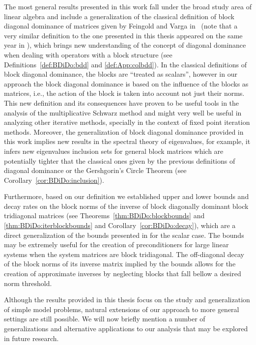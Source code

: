 The most general results presented in this work fall under the broad
study area of linear algebra and include a generalization of the
classical definition of block diagonal dominance of matrices given by Feingold
and Varga in~\cite{FeiVar62} (note that a very similar definition to the one
presented in this thesis appeared on the same year in
\cite{BenEvaHamLupSla17}), which brings new understanding of the concept of
diagonal dominance when dealing with operators with a block structure (see Definitions~\ref{def:BDiDo:bdd} and \ref{def:App:colbdd}). In the
classical definitions of block diagonal dominance, the blocks are ``treated as scalars'', however in our approach the block diagonal dominance is based on the
influence of the blocks as matrices, i.e., the action of the block is taken
into account not just their norms. This new definition and its consequences
have proven to be useful tools in the analysis of the multiplicative Schwarz
method and might very well be useful in analyzing other iterative methods,
specially in the context of fixed point iteration methods. Moreover, the generalization of block diagonal dominance provided in
this work implies new results in the spectral theory of eigenvalues, for
example, it infers new eigenvalues inclusion sets for general block matrices
which are potentially tighter that the classical ones given by the previous
definitions of diagonal dominance or the Gershgorin's Circle Theorem (see
Corollary~\ref{cor:BDiDo:inclusion}).

Furthermore, based on our definition we established upper and lower bounds and
decay rates on the block norms of the inverse of block diagonally dominant
block tridiagonal matrices (see Theorems~\ref{thm:BDiDo:blockbounds} and
\ref{thm:BDiDo:iterblockbounds} and Corollary~\ref{cor:BDiDo:decay}), which are
a direct generalization of the bounds presented in \cite{Nabben99} for the
scalar case. The bounds may be extremely useful for the creation of
preconditioners for large linear systems when the system matrices are block
tridiagonal. The off-diagonal decay of the block norms of its inverse matrix
implied by the bounds allows for the creation of approximate inverses by
neglecting blocks that fall bellow a desired norm threshold.

\medskip

Although the results provided in this thesis focus on the study and
generalization of simple model problems, natural extensions of our approach to
more general settings are still possible. We will now briefly mention a number
of generalizations and alternative applications to our analysis that may be
explored in future research.

